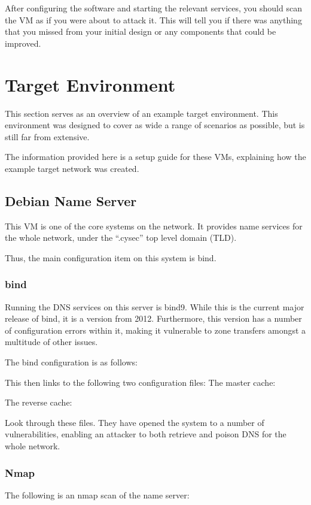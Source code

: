 			After configuring the software and starting the relevant services, you should scan the VM as if you were about to attack it. 
			This will tell you if there was anything that you missed from your initial design or any components that could be improved. 

	\section{Target Environment}
		This section serves as an overview of an example target environment. 
		This environment was designed to cover as wide a range of scenarios as possible, but is still far from extensive\cite{CTFBlueprints}.

		The information provided here is a setup guide for these VMs, explaining how the example target network was created. 
		\subsection{Debian Name Server}
			This VM is one of the core systems on the network. 
			It provides name services for the whole network, under the ``.cysec'' top level domain (TLD).

			Thus, the main configuration item on this system is bind. 
			\subsubsection{bind}
				Running the DNS services on this server is bind9. 
				While this is the current major release of bind, it is a version from 2012. 
				Furthermore, this version has a number of configuration errors within it, making it vulnerable to zone transfers amongst a multitude of other issues. 

				The bind configuration is as follows:
				

				This then links to the following two configuration files:
				The master cache:
				
				The reverse cache:
				

				Look through these files. 
				They have opened the system to a number of vulnerabilities, enabling an attacker to both retrieve and poison DNS for the whole network. 

			\subsubsection{Nmap}
				The following is an nmap scan of the name server:
				
